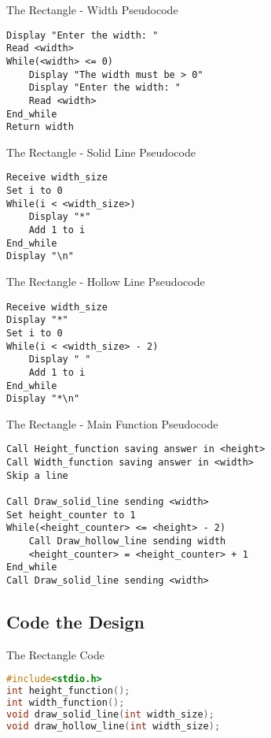 \documentclass[graphics]{beamer}
\begin{document}
\begin{frame}[fragile]{The Rectangle - Width Pseudocode}
    \begin{verbatim}
Display "Enter the width: "
Read <width>
While(<width> <= 0)
    Display "The width must be > 0"
    Display "Enter the width: "
    Read <width>
End_while
Return width
    \end{verbatim}
\end{frame}

\begin{frame}[fragile]{The Rectangle - Solid Line Pseudocode}
    \begin{verbatim}
Receive width_size
Set i to 0
While(i < <width_size>)
    Display "*"
    Add 1 to i
End_while
Display "\n"
    \end{verbatim}
\end{frame}

\begin{frame}[fragile]{The Rectangle - Hollow Line Pseudocode}
    \begin{verbatim}
Receive width_size
Display "*"
Set i to 0
While(i < <width_size> - 2)
    Display " "
    Add 1 to i
End_while
Display "*\n"
    \end{verbatim}
\end{frame}

\begin{frame}[fragile]{The Rectangle - Main Function Pseudocode}
    \begin{verbatim}
Call Height_function saving answer in <height>
Call Width_function saving answer in <width>
Skip a line

Call Draw_solid_line sending <width>
Set height_counter to 1
While(<height_counter> <= <height> - 2)
    Call Draw_hollow_line sending width
    <height_counter> = <height_counter> + 1
End_while
Call Draw_solid_line sending <width>
    \end{verbatim}
\end{frame}

\subsection{Code the Design}
\begin{frame}[fragile]{The Rectangle Code}
    \begin{lstlisting}[language=C,basicstyle=\footnotesize,keywordstyle=\color{blue},commentstyle=\color{green},showstringspaces=false,stringstyle=\color{red}]
#include<stdio.h>
int height_function();
int width_function();
void draw_solid_line(int width_size);
void draw_hollow_line(int width_size);
    \end{lstlisting}
\end{frame}
\end{document}
